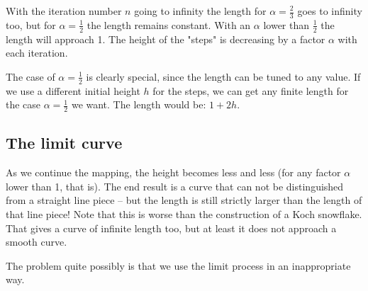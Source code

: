 \documentclass[onecolumn]{article}
\begin{document}
With the iteration number \(n\) going to infinity the length for \(\alpha = \frac{2}{3}\)
goes to infinity too, but for \(\alpha = \frac{1}{2}\) the length remains
constant. With an \(\alpha\) lower than \(\frac{1}{2}\) the length will approach
1. The height of the "steps" is decreasing by a factor \(\alpha\) with
each iteration.

The case of \(\alpha = \frac{1}{2}\) is clearly special, since the length
can be tuned to any value. If we use a different initial height \(h\) for the
steps, we can get any finite length for the case \(\alpha = \frac{1}{2}\) we
want. The length would be: \(1 + 2h\).

\subsection*{The limit curve}
As we continue the mapping, the height becomes less and less (for any factor
\(\alpha\) lower than 1, that is). The end result is a curve that can not be
distinguished from a straight line piece -- but the length is still strictly
larger than the length of that line piece! Note that this is worse than the
construction of a Koch snowflake. That gives a curve of infinite length too, but
at least it does not approach a smooth curve.

The problem quite possibly is that we use the limit process in an inappropriate
way.
\end{document}
